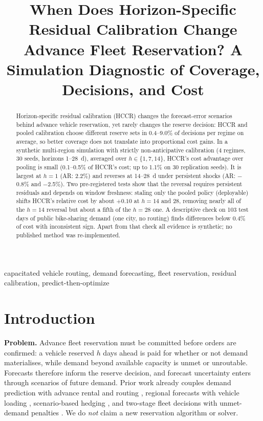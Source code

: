\documentclass[conference]{IEEEtran}
\begin{document}
\title{When Does Horizon-Specific Residual Calibration Change Advance Fleet Reservation? A Simulation Diagnostic of Coverage, Decisions, and Cost}
\author{
}
\maketitle

\begin{abstract}
Horizon-specific residual calibration (HCCR) changes the forecast-error scenarios behind advance vehicle reservation, yet rarely changes the reserve decision: HCCR and pooled calibration choose different reserve sets in 0.4--9.0\% of decisions per regime on average, so better coverage does not translate into proportional cost gains. In a synthetic multi-region simulation with strictly non-anticipative calibration (4 regimes, 30 seeds, horizons 1--28~d), averaged over $h\in\{1,7,14\}$, HCCR's cost advantage over pooling is small (0.1--0.5\% of HCCR's cost; up to 1.1\% on 30 replication seeds). It is largest at $h{=}1$ (AR: 2.2\%) and reverses at 14--28~d under persistent shocks (AR: $-$0.8\% and $-$2.5\%). Two pre-registered tests show that the reversal requires persistent residuals and depends on window freshness: staling only the pooled policy (deployable) shifts HCCR's relative cost by about $+0.10$ at $h{=}14$ and 28, removing nearly all of the $h{=}14$ reversal but about a fifth of the $h{=}28$ one. A descriptive check on 103 test days of public bike-sharing demand (one city, no routing) finds differences below 0.4\% of cost with inconsistent sign. Apart from that check all evidence is synthetic; no published method was re-implemented.
\end{abstract}
\begin{IEEEkeywords}
capacitated vehicle routing, demand forecasting, fleet reservation, residual calibration, predict-then-optimize
\end{IEEEkeywords}

\section{Introduction}
\textbf{Problem.} Advance fleet reservation must be committed before orders are confirmed: a vehicle reserved $h$ days ahead is paid for whether or not demand materialises, while demand beyond available capacity is unmet or unroutable. Forecasts therefore inform the reserve decision, and forecast uncertainty enters through scenarios of future demand. Prior work already couples demand prediction with advance rental and routing \cite{wei2024}, regional forecasts with vehicle loading \cite{armayau2026}, scenario-based hedging \cite{jia2025}, and two-stage fleet decisions with unmet-demand penalties \cite{beatrici2025}. We do \emph{not} claim a new reservation algorithm or solver.
\end{document}
